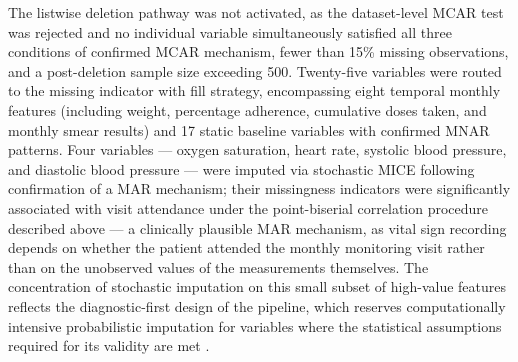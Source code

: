 \documentclass[12pt]{article}
\begin{document}
The listwise deletion pathway was not activated, as the dataset-level MCAR test was rejected and no individual variable simultaneously satisfied all three conditions of confirmed MCAR mechanism, fewer than 15\% missing observations, and a post-deletion sample size exceeding 500. Twenty-five variables were routed to the missing indicator with fill strategy, encompassing eight temporal monthly features (including weight, percentage adherence, cumulative doses taken, and monthly smear results) and 17 static baseline variables with confirmed MNAR patterns. Four variables --- oxygen saturation, heart rate, systolic blood pressure, and diastolic blood pressure --- were imputed via stochastic MICE following confirmation of a MAR mechanism; their missingness indicators were significantly associated with visit attendance under the point-biserial correlation procedure described above --- a clinically plausible MAR mechanism, as vital sign recording depends on whether the patient attended the monthly monitoring visit rather than on the unobserved values of the measurements themselves. The concentration of stochastic imputation on this small subset of high-value features reflects the diagnostic-first design of the pipeline, which reserves computationally intensive probabilistic imputation for variables where the statistical assumptions required for its validity are met \citep{ref31, ref33}.
\end{document}
